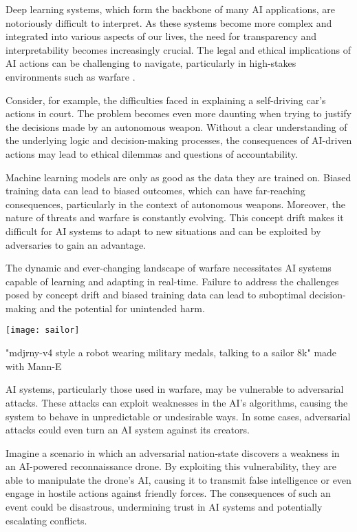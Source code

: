 Deep learning systems, which form the backbone of many AI applications, are notoriously difficult to interpret. As these systems become more complex and integrated into various aspects of our lives, the need for transparency and interpretability becomes increasingly crucial. The legal and ethical implications of AI actions can be challenging to navigate, particularly in high-stakes environments such as warfare \cite{saferalgorithmicsystems}.

Consider, for example, the difficulties faced in explaining a self-driving car's actions in court. The problem becomes even more daunting when trying to justify the decisions made by an autonomous weapon. Without a clear understanding of the underlying logic and decision-making processes, the consequences of AI-driven actions may lead to ethical dilemmas and questions of accountability.

Machine learning models are only as good as the data they are trained on. Biased training data can lead to biased outcomes, which can have far-reaching consequences, particularly in the context of autonomous weapons. Moreover, the nature of threats and warfare is constantly evolving. This concept drift makes it difficult for AI systems to adapt to new situations and can be exploited by adversaries to gain an advantage.

The dynamic and ever-changing landscape of warfare necessitates AI systems capable of learning and adapting in real-time. Failure to address the challenges posed by concept drift and biased training data can lead to suboptimal decision-making and the potential for unintended harm.

\begin{marginfigure}[-5.5cm]
        \texttt{[image: sailor]}
        \caption{"mdjrny-v4 style a robot wearing military medals, talking to a sailor 8k" made with Mann-E}
\end{marginfigure}

AI systems, particularly those used in warfare, may be vulnerable to adversarial attacks. These attacks can exploit weaknesses in the AI's algorithms, causing the system to behave in unpredictable or undesirable ways. In some cases, adversarial attacks could even turn an AI system against its creators.

Imagine a scenario in which an adversarial nation-state discovers a weakness in an AI-powered reconnaissance drone. By exploiting this vulnerability, they are able to manipulate the drone's AI, causing it to transmit false intelligence or even engage in hostile actions against friendly forces. The consequences of such an event could be disastrous, undermining trust in AI systems and potentially escalating conflicts.


